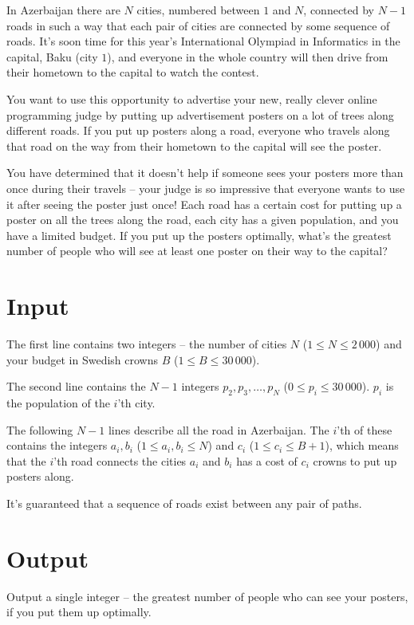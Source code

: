 \noindent
In Azerbaijan there are $N$ cities, numbered between $1$ and $N$, connected by $N - 1$ roads in such a way that each pair of cities are connected by some sequence of roads.
It's soon time for this year's International Olympiad in Informatics in the capital, Baku (city $1$), and everyone in the whole country will then drive from their hometown to the capital to watch the contest.

You want to use this opportunity to advertise your new, really clever online programming judge by putting up advertisement posters on a lot of trees along different roads.
If you put up posters along a road, everyone who travels along that road on the way from their hometown to the capital will see the poster.

You have determined that it doesn't help if someone sees your posters more than once during their travels -- your judge is so impressive that everyone wants to use it after seeing the poster just once!
Each road has a certain cost for putting up a poster on all the trees along the road, each city has a given population, and you have a limited budget.
If you put up the posters optimally, what's the greatest number of people who will see at least one poster on their way to the capital?

\section*{Input}
The first line contains two integers -- the number of cities $N$ ($1 \le N \le 2\,000$) and your budget in Swedish crowns $B$ ($1 \le B \le 30\,000$).

The second line contains the $N-1$ integers $p_2, p_3, \dots, p_N$ ($0 \le p_i \le 30\,000$).
$p_i$ is the population of the $i$'th city.

The following $N-1$ lines describe all the road in Azerbaijan.
The $i$'th of these contains the integers $a_i, b_i$ ($1 \le a_i, b_i \le N$) and $c_i$ ($1 \le c_i \le B+1$), which means that the $i$'th road connects the cities $a_i$ and $b_i$ has a cost of $c_i$ crowns to put up posters along.

It's guaranteed that a sequence of roads exist between any pair of paths.

\section*{Output}
Output a single integer -- the greatest number of people who can see your posters, if you put them up optimally.

